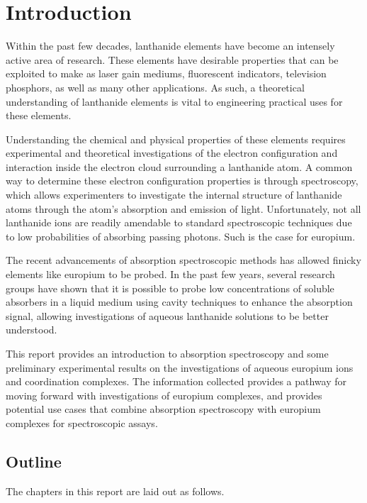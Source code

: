 \chapter*{Introduction}  \label{chap:intro}

Within the past few decades, lanthanide elements have become an intensely
active area of research. These elements have desirable properties that can be
exploited to make as laser gain mediums, fluorescent indicators, television
phosphors, as well as many other applications\cite{Bunzli:2005ic}. As such, a
theoretical understanding of lanthanide elements is vital to engineering
practical uses for these elements.

Understanding the chemical and physical properties of these elements requires
experimental and theoretical investigations of the electron configuration and
interaction inside the electron cloud surrounding a lanthanide atom. A common
way to determine these electron configuration properties is through
spectroscopy, which allows experimenters to investigate the internal structure
of lanthanide atoms through the atom's absorption and emission of light.
Unfortunately, not all lanthanide ions are readily amendable to standard
spectroscopic techniques due to low probabilities of absorbing passing
photons.  Such is the case for europium.

The recent advancements of absorption spectroscopic methods has allowed finicky
elements like europium to be probed. In the past few years, several research
groups have shown that it is possible to probe low concentrations of soluble
absorbers in a liquid medium using cavity techniques to enhance the absorption
signal, allowing investigations of aqueous lanthanide solutions to be better
understood.

This report provides an introduction to absorption spectroscopy and some
preliminary experimental results on the investigations of aqueous europium ions
and coordination complexes. The information collected provides a pathway for
moving forward with investigations of europium complexes, and provides
potential use cases that combine absorption spectroscopy with europium
complexes for spectroscopic assays.

\section*{Outline}

The chapters in this report are laid out as follows.


